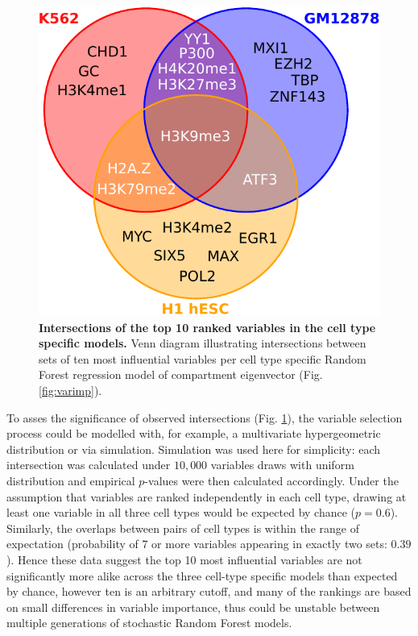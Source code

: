\documentclass[a4paper,11pt,oneside]{book}
\begin{document}
\begin{figure}
\begin{center} 
\includegraphics[width=.5\textwidth]{figs/top10venn.pdf}
\captionsetup{width=\textwidth} 
\caption{ {\bf Intersections of the top 10 ranked variables in the cell type specific models. }
Venn diagram illustrating intersections between sets of ten most influential variables per cell type specific Random Forest regression model of compartment eigenvector (Fig. \ref{fig:varimp}).
}\label{fig:top10venn}
\end{center} 
\end{figure} 

To asses the significance of observed intersections (Fig. \ref{fig:top10venn}), the variable selection process could be modelled with, for example, a multivariate hypergeometric distribution or via simulation. Simulation was used here for simplicity: each intersection was calculated under $10,000$ variables draws with uniform distribution and empirical $p$-values were then calculated accordingly. Under the assumption that variables are ranked independently in each cell type, drawing at least one variable in all three cell types would be expected by chance ($p = 0.6$). Similarly, the overlaps between pairs of cell types is within the range of expectation (probability of 7 or more variables appearing in exactly two sets: $0.39$). Hence these data suggest the top 10 most influential variables are not significantly more alike across the three cell-type specific models than expected by chance, however ten is an arbitrary cutoff, and many of the rankings are based on small differences in variable importance, thus could be unstable between multiple generations of stochastic Random Forest models.
\end{document}
